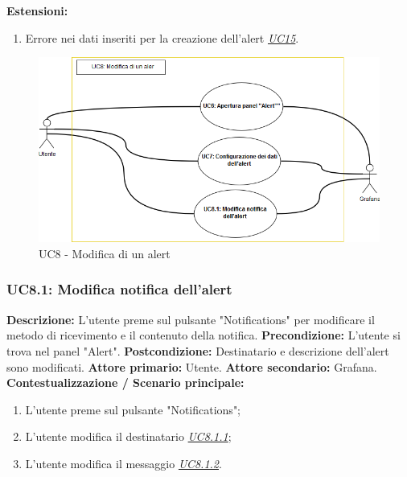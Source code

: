                     \textbf{Estensioni:} 
                    \begin{enumerate}
                            \item Errore nei dati inseriti per la creazione dell'alert \underline{\textit{UC15}}.
                        \end{enumerate} 		
                		
                        \begin{figure}[!htbp]
                    	\centering
                    	\includegraphics[width=\textwidth]{UC8.png}
                    	\caption{UC8 - Modifica di un alert}
                    	\label{uc8}
                    \end{figure}
                        
                      
                \subsubsection{UC8.1: Modifica notifica dell'alert }
                    \textbf{Descrizione:} L’utente preme sul pulsante "Notifications" per modificare il metodo di ricevimento e il contenuto della notifica.
                    \newline
                    \textbf{Precondizione:} L'utente si trova nel panel "Alert".
                    \newline
                    \textbf{Postcondizione:} Destinatario e descrizione dell'alert sono modificati.
                    \newline
                    \textbf{Attore primario:} Utente.
                    \newline
                    \textbf{Attore secondario:} Grafana.
                    \newline
                    \textbf{Contestualizzazione / Scenario principale:} \begin{enumerate}
                            \item L'utente preme sul pulsante "Notifications";
                            \item L'utente modifica il destinatario \underline{\textit{UC8.1.1}};
                            \item L'utente modifica il messaggio \underline{\textit{UC8.1.2}}.
                        \end{enumerate}
                        
